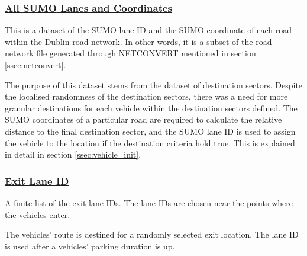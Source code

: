 \subsubsection{\underline{All \ac{SUMO} Lanes and Coordinates}}
\begin{description}[leftmargin=8em,style=nextline]
  \item[Explanation] This is a dataset of the \ac{SUMO} lane ID and the \ac{SUMO} coordinate of each road within the Dublin road network. In other words, it is a subset of the road network file generated through NETCONVERT mentioned in section \ref{ssec:netconvert}.
  \item[Purpose] The purpose of this dataset stems from the dataset of destination sectors. Despite the localised randomness of the destination sectors, there was a need for more granular destinations for each vehicle within the destination sectors defined. The \ac{SUMO} coordinates of a particular road are required to calculate the relative distance to the final destination sector, and the \ac{SUMO} lane ID is used to assign the vehicle to the location if the destination criteria hold true. This is explained in detail in section \ref{ssec:vehicle_init}.
\end{description}

\subsubsection{\underline{Exit Lane ID}}
\begin{description}[leftmargin=8em,style=nextline]
  \item[Explanation] A finite list of the exit lane IDs. The lane IDs are chosen near the points where the vehicles enter.
  \item[Purpose] The vehicles' route is destined for a randomly selected exit location. The lane ID is used after a vehicles' parking duration is up.
\end{description}

